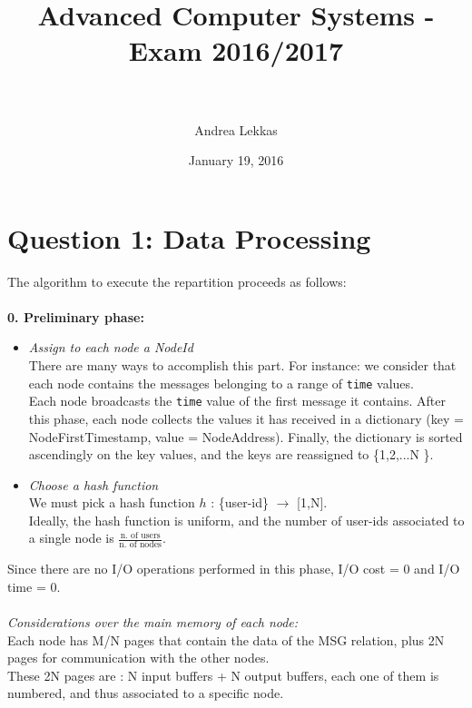 \documentclass[paper=a4, fontsize=11pt]{scrartcl} %
\title{	
	\textsf{\huge Advanced Computer Systems - Exam 2016/2017 \\} %
	\horrule{0.5pt} \\[0.4cm] %
}
\author {\normalsize Andrea Lekkas} %
\date{\normalsize January 19, 2016 } %
\numberwithin{equation}{section} %
\numberwithin{figure}{section} %
\numberwithin{table}{section} %
\begin{document}
\maketitle %


\setcounter{secnumdepth}{0}

\section{Question 1: Data Processing}
The algorithm to execute the repartition proceeds as follows:\\
~\\
\textbf{0. Preliminary phase:} 
\begin{itemize}
\item \textit{Assign to each node a NodeId}\\
There are many ways to accomplish this part. For instance: we consider that each node contains the messages belonging to a range of \verb|time| values. \\
Each node broadcasts the \verb|time| value of the first message it contains. After this phase, each node collects the values it has received in a dictionary (key = NodeFirstTimestamp, value = NodeAddress). Finally, the dictionary is sorted ascendingly on the key values, and the keys are reassigned to \{1,2,...N \}.\\
\item \textit{Choose a hash function}\\
We must pick a hash function $h$ : \{user-id\} $ \rightarrow $ [1,N].\\
Ideally, the hash function is uniform, and the number of user-ids associated to a single node is $ \frac{\text{n. of users}}{\text{n. of nodes}}$.\\
\end{itemize}
Since there are no I/O operations performed in this phase, I/O cost = 0  and  I/O time = 0.\\~\\
\textit{Considerations over the main memory of each node:}\\
Each node has M/N pages that contain the data of the MSG relation, plus 2N pages for communication with the other nodes.\\
These 2N pages are : N input buffers + N output buffers, each one of them is numbered, and thus associated to a specific node.\\
~\\
\end{document}

